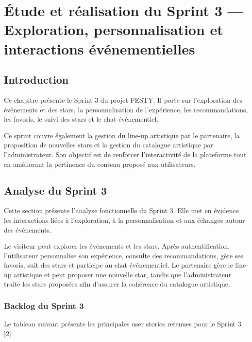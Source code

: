 ﻿%

\chapter{Étude et réalisation du Sprint 3 — Exploration, personnalisation et interactions événementielles}
\label{chap:sprint3-exploration-personnalisation}


\section{Introduction}


Ce chapitre présente le Sprint 3 du projet FESTY. Il porte sur l’exploration des événements et des stars, la personnalisation de l’expérience, les recommandations, les favoris, le suivi des stars et le chat événementiel.


Ce sprint couvre également la gestion du line-up artistique par le partenaire, la proposition de nouvelles stars et la gestion du catalogue artistique par l’administrateur. Son objectif est de renforcer l’interactivité de la plateforme tout en améliorant la pertinence du contenu proposé aux utilisateurs.


\section{Analyse du Sprint 3}


Cette section présente l’analyse fonctionnelle du Sprint 3. Elle met en évidence les interactions liées à l’exploration, à la personnalisation et aux échanges autour des événements.


Le visiteur peut explorer les événements et les stars. Après authentification, l’utilisateur personnalise son expérience, consulte des recommandations, gère ses favoris, suit des stars et participe au chat événementiel. Le partenaire gère le line-up artistique et peut proposer une nouvelle star, tandis que l’administrateur traite les stars proposées afin d’assurer la cohérence du catalogue artistique.


\subsection{Backlog du Sprint 3}


Le tableau suivant présente les principales user stories retenues pour le Sprint 3 [2].


